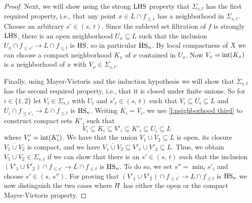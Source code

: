 \begin{proof}
	Next, we will show using the strong $\mathrm{LHS}$ property that $\Sigma_{s, t}$ has the first required property, i.e., that any point $x \in L \cap f_{\leq s}$ has a neighborhood in $\Sigma_{s, t}$.
	Choose an arbitrary $s' \in (s,\, t)$.
	Since the sublevel set filtration of $f$ is strongly $\mathrm{LHS}$, there is an open neighborhood $U_x \subseteq L$ such that the inclusion
	$U_x \cap f_{\leq s'} \to L \cap f_{\leq t}$
	is $\mathrm{HS}$, so in particular $\mathrm{HS}_n$.
	By local compactness of $X$ we can choose a compact neighborhood $K_x$ of $x$ contained in $U_x$.
	Now $V_x = \operatorname{int} (K_x)$ is a neighborhood of $x$ with $V_x \in \Sigma_{s,t}$.
	
	Finally, using Mayer-Vietoris and the induction hypothesis we will show that $\Sigma_{s,t}$ has the second required property, i.e., that it is closed under finite unions.
	So for $i \in \{1, 2\}$ let $V_i \in \Sigma_{s,t}$ with $U_i$ and $s'_i \in (s,\, t)$ such that 
	$\overline{V_i} \subseteq U_i \subseteq L$ 
	and
	$U_{i} \cap f_{\leq s'_i} \to L \cap f_{\leq t}$
	is $\mathrm{HS}_n$.
	Writing $K_i = \overline{V_i}$, we use \cref{l:neighborhood third} to construct compact sets $K'_i$ such that
	\begin{equation*}
	V_i \subseteq K_i \subseteq V'_i \subseteq K'_i \subseteq U_i \subseteq L
	\end{equation*}
	where $V'_i = \operatorname{int}(K'_i)$.
	We have that the union $V_1 \cup V_2 \subseteq L$ is open, its closure $\overline{V_1 \cup V_2}$ is compact, and we have $\overline{V_1 \cup V_2} \subseteq V'_1 \cup V'_2 \subseteq L$.
	Thus, we obtain $V_1 \cup V_2 \in \Sigma_{s,t}$ if we can show that there is an $s' \in (s,\, t)$ such that the inclusion 
	$\left(V'_1 \cup V'_2 \right) \cap f_{\leq s'} \to L \cap f_{\leq t}$
	is $\mathrm{HS}_n$.
	To do so, we set $s'' = \min_i s'_i$ and choose $s' \in (s,\, s'')$.
	For proving that $\left(V'_1 \cup V'_2 \right) \cap f_{\leq s'} \to L \cap f_{\leq t}$ is $\mathrm{HS}_n$ we now distinguish the two cases where $H$ has either the open or the compact Mayer-Vietoris property.
	

\end{proof}
